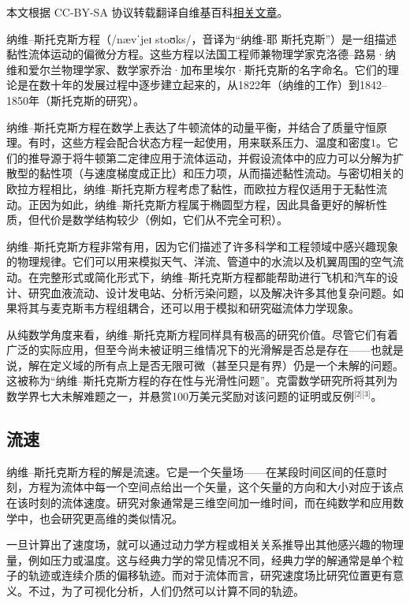 
本文根据 CC-BY-SA 协议转载翻译自维基百科\href{https://en.wikipedia.org/wiki/Navier\%E2\%80\%93Stokes_equations}{相关文章}。

纳维–斯托克斯方程（/nævˈjeɪ stoʊks/，音译为“纳维-耶 斯托克斯”）是一组描述黏性流体运动的偏微分方程。这些方程以法国工程师兼物理学家克洛德–路易·纳维和爱尔兰物理学家、数学家乔治·加布里埃尔·斯托克斯的名字命名。它们的理论是在数十年的发展过程中逐步建立起来的，从1822年（纳维的工作）到1842–1850年（斯托克斯的研究）。

纳维–斯托克斯方程在数学上表达了牛顿流体的动量平衡，并结合了质量守恒原理。有时，这些方程会配合状态方程一起使用，用来联系压力、温度和密度$1$。它们的推导源于将牛顿第二定律应用于流体运动，并假设流体中的应力可以分解为扩散型的黏性项（与速度梯度成正比）和压力项，从而描述黏性流动。与密切相关的欧拉方程相比，纳维–斯托克斯方程考虑了黏性，而欧拉方程仅适用于无黏性流动。正因为如此，纳维–斯托克斯方程属于椭圆型方程，因此具备更好的解析性质，但代价是数学结构较少（例如，它们从不完全可积）。

纳维–斯托克斯方程非常有用，因为它们描述了许多科学和工程领域中感兴趣现象的物理规律。它们可以用来模拟天气、洋流、管道中的水流以及机翼周围的空气流动。在完整形式或简化形式下，纳维–斯托克斯方程都能帮助进行飞机和汽车的设计、研究血液流动、设计发电站、分析污染问题，以及解决许多其他复杂问题。如果将其与麦克斯韦方程组耦合，还可以用于模拟和研究磁流体力学现象。

从纯数学角度来看，纳维–斯托克斯方程同样具有极高的研究价值。尽管它们有着广泛的实际应用，但至今尚未被证明三维情况下的光滑解是否总是存在——也就是说，解在定义域的所有点上是否无限可微（甚至只是有界）仍是一个未解的问题。这被称为“纳维–斯托克斯方程的存在性与光滑性问题”。克雷数学研究所将其列为数学界七大未解难题之一，并悬赏100万美元奖励对该问题的证明或反例\(^\text{[2][3]}\)。
\subsection{流速}
纳维–斯托克斯方程的解是流速。它是一个矢量场——在某段时间区间的任意时刻，方程为流体中每一个空间点给出一个矢量，这个矢量的方向和大小对应于该点在该时刻的流体速度。研究对象通常是三维空间加一维时间，而在纯数学和应用数学中，也会研究更高维的类似情况。

一旦计算出了速度场，就可以通过动力学方程或相关关系推导出其他感兴趣的物理量，例如压力或温度。这与经典力学的常见情况不同，经典力学的解通常是单个粒子的轨迹或连续介质的偏移轨迹。而对于流体而言，研究速度场比研究位置更有意义。不过，为了可视化分析，人们仍然可以计算不同的轨迹。

